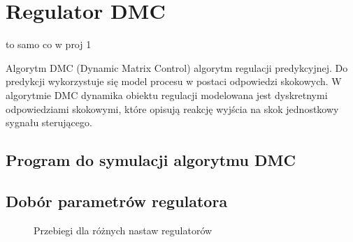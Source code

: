 \section{Regulator DMC}
\label{projekt:zad4}


to samo co w proj 1

Algorytm DMC (Dynamic Matrix Control) algorytm regulacji predykcyjnej. 
Do predykcji wykorzystuje się model procesu w postaci odpowiedzi skokowych. 
W algorytmie DMC dynamika obiektu regulacji modelowana jest dyskretnymi odpowiedziami skokowymi, 
które opisują reakcję wyjścia na skok jednostkowy sygnału sterującego.

\subsection{Program do symulacji algorytmu DMC}
\label{projekt:zad4:programDMC}

\subsection{Dobór parametrów regulatora}
\label{projekt:zad4:parametry}

\begin{figure}[H] 
    \centering
    
    \caption{Przebiegi dla różnych nastaw regulatorów}
    \label{projekt:zad4:parametry:figure}
\end{figure}

